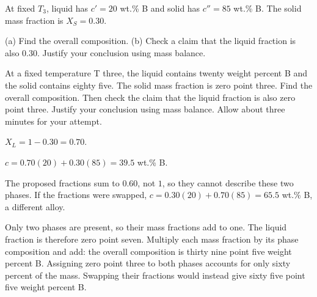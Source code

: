 \documentclass[aspectratio=169,11pt]{beamer}
\begin{document}
  {At fixed $T_3$, liquid has $c'=20$ wt.\% B and solid has $c''=85$ wt.\% B.
   The solid mass fraction is $X_S=0.30$.\par\smallskip
   (a) Find the overall composition. (b) Check a claim that the liquid fraction is also 0.30.
   Justify your conclusion using mass balance.}
  {At a fixed temperature T three, the liquid contains twenty weight percent B and the solid
   contains eighty five. The solid mass fraction is zero point three. Find the overall
   composition. Then check the claim that the liquid fraction is also zero point three.
   Justify your conclusion using mass balance. Allow about three minutes for your attempt.}
  {$X_L=1-0.30=0.70$.\par\medskip
   $c=0.70(20)+0.30(85)=39.5$ wt.\% B.\par\medskip
   The proposed fractions sum to $0.60$, not $1$, so they cannot describe these two phases.
   If the fractions were swapped, $c=0.30(20)+0.70(85)=65.5$ wt.\% B, a different alloy.}
  {Only two phases are present, so their mass fractions add to one. The liquid fraction is
   therefore zero point seven. Multiply each mass fraction by its phase composition and add:
   the overall composition is thirty nine point five weight percent B. Assigning zero point
   three to both phases accounts for only sixty percent of the mass. Swapping their fractions
   would instead give sixty five point five weight percent B.}

\end{document}
